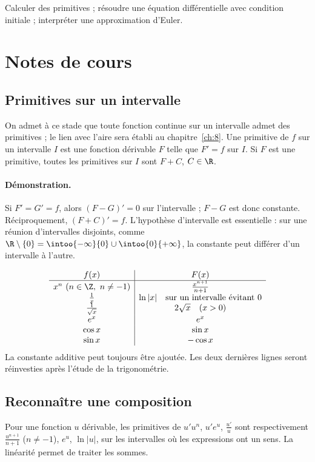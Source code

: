 \label{ch:7}


\begin{keypoint}[Objectifs]Calculer des primitives ; résoudre une équation différentielle avec condition initiale ; interpréter une approximation d'Euler.\end{keypoint}

\section{Notes de cours}
\subsection{Primitives sur un intervalle}
On admet à ce stade que toute fonction continue sur un intervalle admet des primitives ; le lien avec l'aire sera établi au chapitre~\ref{ch:8}.
Une primitive de $f$ sur un intervalle $I$ est une fonction dérivable $F$ telle que $F'=f$ sur $I$. Si $F$ est une primitive, toutes les primitives sur $I$ sont $F+C$, $C\in\R$.
\paragraph{Démonstration.} Si $F'=G'=f$, alors $(F-G)'=0$ sur l'intervalle ; $F-G$ est donc constante. Réciproquement, $(F+C)'=f$. L'hypothèse d'intervalle est essentielle : sur une réunion d'intervalles disjoints, comme $\R\setminus\{0\}=\intoo{-\infty}{0}\cup\intoo{0}{+\infty}$, la constante peut différer d'un intervalle à l'autre.
\begin{keypoint}
\[\begin{array}{c|c}
f(x)&F(x)\\\hline
x^n\ (n\in\Z,\ n\ne-1)&\frac{x^{n+1}}{n+1}\\
\frac{1}{x}&\ln|x|\quad\text{sur un intervalle évitant }0\\
\frac{1}{\sqrt{x}}&2\sqrt{x}\quad(x>0)\\
e^x&e^x\\
\cos x&\sin x\\
\sin x&-\cos x
\end{array}\]
La constante additive peut toujours être ajoutée. Les deux dernières lignes seront réinvesties après l'étude de la trigonométrie.
\end{keypoint}
\subsection{Reconnaître une composition}
Pour une fonction $u$ dérivable, les primitives de $u'u^n$, $u'e^u$, $\frac{u'}{u}$ sont respectivement $\frac{u^{n+1}}{n+1}$ ($n\ne-1$), $e^u$, $\ln|u|$, sur les intervalles où les expressions ont un sens. La linéarité permet de traiter les sommes.

